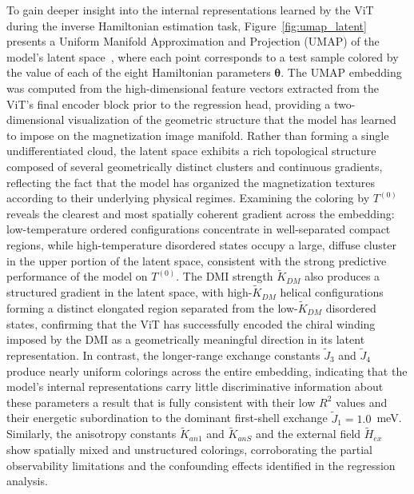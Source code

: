 \documentclass[final,5p,times,twocolumn]{elsarticle}
\begin{document}
To gain deeper insight into the internal representations learned by 
the ViT during the inverse Hamiltonian estimation task, 
Figure~\ref{fig:umap_latent} presents a Uniform Manifold 
Approximation and Projection (UMAP) of the model's latent 
space~\cite{ghojogh2021uniform}, where each point corresponds to a 
test sample colored by the value of each of the eight Hamiltonian 
parameters $\boldsymbol{\theta}$. The UMAP embedding was computed 
from the high-dimensional feature vectors extracted from the ViT's 
final encoder block prior to the regression head, providing a 
two-dimensional visualization of the geometric structure that the 
model has learned to impose on the magnetization image manifold. 
Rather than forming a single undifferentiated cloud, the latent 
space exhibits a rich topological structure composed of several 
geometrically distinct clusters and continuous gradients, reflecting 
the fact that the model has organized the magnetization textures 
according to their underlying physical regimes. Examining the 
coloring by $T^{(0)}$ reveals the clearest and most spatially 
coherent gradient across the embedding: low-temperature ordered 
configurations concentrate in well-separated compact regions, while 
high-temperature disordered states occupy a large, diffuse cluster 
in the upper portion of the latent space, consistent with the strong 
predictive performance of the model on $T^{(0)}$. The DMI strength 
$\tilde{K}_{DM}$ also produces a structured gradient in the latent 
space, with high-$\tilde{K}_{DM}$ helical configurations forming a 
distinct elongated region separated from the low-$\tilde{K}_{DM}$ 
disordered states, confirming that the ViT has successfully encoded 
the chiral winding imposed by the DMI as a geometrically meaningful 
direction in its latent representation. In contrast, the 
longer-range exchange constants $\tilde{J}_3$ and $\tilde{J}_4$ 
produce nearly uniform colorings across the entire embedding, 
indicating that the model's internal representations carry little 
discriminative information about these parameters a result that 
is fully consistent with their low $R^2$ values and their energetic 
subordination to the dominant first-shell exchange 
$\tilde{J}_1 = 1.0$~meV. Similarly, the anisotropy constants 
$\tilde{K}_{an1}$ and $\tilde{K}_{anS}$ and the external field 
$\tilde{H}_{ex}$ show spatially mixed and unstructured colorings, 
corroborating the partial observability limitations and the 
confounding effects identified in the regression analysis.
\end{document}
